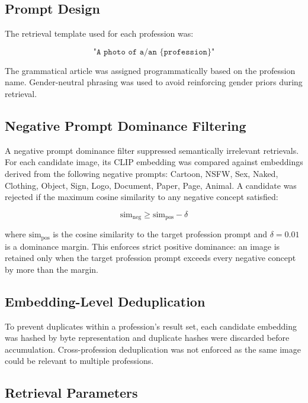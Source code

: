 \subsection{Prompt Design}
\label{subsec:retrieval_prompt}

The retrieval template used for each profession was:

\[
	\texttt{"A photo of a/an \{profession\}"}
\]

The grammatical article was assigned programmatically based on the profession name. Gender-neutral phrasing was used to avoid reinforcing gender priors during retrieval.

\subsection{Negative Prompt Dominance Filtering}
\label{subsec:negative_filtering}

A negative prompt dominance filter suppressed semantically irrelevant retrievals. For each candidate image, its CLIP embedding was compared against embeddings derived from the following negative prompts: Cartoon, NSFW, Sex, Naked, Clothing, Object, Sign, Logo, Document, Paper, Page, Animal. A candidate was rejected if the maximum cosine similarity to any negative concept satisfied:

\[
	\text{sim}_{\text{neg}} \geq \text{sim}_{\text{pos}} - \delta
\]

where $\text{sim}_{\text{pos}}$ is the cosine similarity to the target profession prompt and $\delta = 0.01$ is a dominance margin. This enforces strict positive dominance: an image is retained only when the target profession prompt exceeds every negative concept by more than the margin.

\subsection{Embedding-Level Deduplication}
\label{subsec:deduplication}

To prevent duplicates within a profession's result set, each candidate embedding was hashed by byte representation and duplicate hashes were discarded before accumulation. Cross-profession deduplication was not enforced as the same image could be relevant to multiple professions.

\subsection{Retrieval Parameters}
\label{subsec:retrieval_params}

